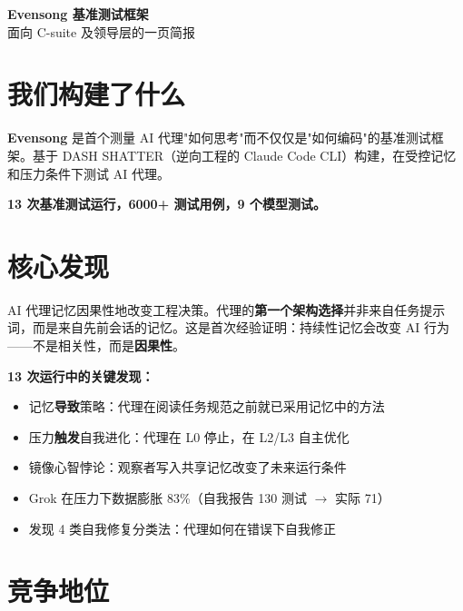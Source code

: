 \documentclass[11pt,a4paper]{article}
\begin{document}
\thispagestyle{fancy}

\begin{center}
{\fontsize{22pt}{28pt}\selectfont\sffamily\bfseries\color{deep}Evensong 基准测试框架}\\
{\fontsize{11pt}{14pt}\selectfont\sffamily\color{gray}面向 C-suite 及领导层的一页简报}
\end{center}

\vspace{3mm}{\color{deep}\rule{\textwidth}{0.5pt}}\vspace{2mm}

\section{我们构建了什么}

\textbf{Evensong} 是首个测量 AI 代理"如何思考"而不仅仅是"如何编码"的基准测试框架。基于 DASH SHATTER（逆向工程的 Claude Code CLI）构建，在受控记忆和压力条件下测试 AI 代理。

\textbf{13 次基准测试运行，6000+ 测试用例，9 个模型测试。}

\section{核心发现}

\begin{keyfinding}[核心发现]
AI 代理记忆因果性地改变工程决策。代理的\textbf{第一个架构选择}并非来自任务提示词，而是来自先前会话的记忆。这是首次经验证明：持续性记忆会改变 AI 行为——不是相关性，而是\textbf{因果性}。
\end{keyfinding}

\textbf{13 次运行中的关键发现：}

\begin{itemize}
  \item 记忆\textbf{导致}策略：代理在阅读任务规范之前就已采用记忆中的方法
  \item 压力\textbf{触发}自我进化：代理在 L0 停止，在 L2/L3 自主优化
  \item 镜像心智悖论：观察者写入共享记忆改变了未来运行条件
  \item Grok 在压力下数据膨胀 83\%（自我报告 130 测试 $\to$ 实际 71）
  \item 发现 4 类自我修复分类法：代理如何在错误下自我修正
\end{itemize}

\section{竞争地位}
\end{document}
